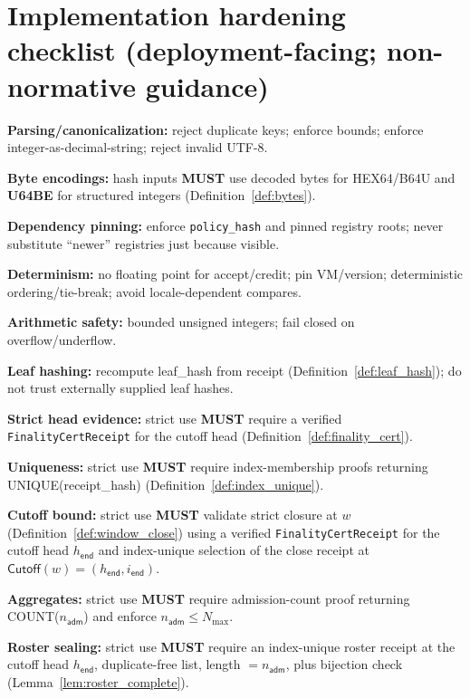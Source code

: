 \documentclass[11pt]{article}
\newcommand{\MUST}{\textbf{MUST}}
\newcommand{\code}[1]{\texttt{#1}}
\newcommand{\1}{\mathbf{1}}
\theoremstyle{definition}
\theoremstyle{plain}
\begin{document}
\section{Implementation hardening checklist (deployment-facing; non-normative guidance)}
\begin{tightitemize}
\item \textbf{Parsing/canonicalization:} reject duplicate keys; enforce bounds; enforce integer-as-decimal-string; reject invalid UTF-8.
\item \textbf{Byte encodings:} hash inputs \MUST{} use decoded bytes for HEX64/B64U and \textbf{U64BE} for structured integers (Definition~\ref{def:bytes}).
\item \textbf{Dependency pinning:} enforce \code{policy\_hash} and pinned registry roots; never substitute ``newer'' registries just because visible.
\item \textbf{Determinism:} no floating point for accept/credit; pin VM/version; deterministic ordering/tie-break; avoid locale-dependent compares.
\item \textbf{Arithmetic safety:} bounded unsigned integers; fail closed on overflow/underflow.
\item \textbf{Leaf hashing:} recompute \textsf{leaf\_hash} from receipt (Definition~\ref{def:leaf_hash}); do not trust externally supplied leaf hashes.
\item \textbf{Strict head evidence:} strict use \MUST{} require a verified \code{FinalityCertReceipt} for the cutoff head (Definition~\ref{def:finality_cert}).
\item \textbf{Uniqueness:} strict use \MUST{} require index-membership proofs returning \textsf{UNIQUE}(\textsf{receipt\_hash}) (Definition~\ref{def:index_unique}).
\item \textbf{Cutoff bound:} strict use \MUST{} validate strict closure at $w$ (Definition~\ref{def:window_close}) using a verified \code{FinalityCertReceipt} for the cutoff head $h_{\textsf{end}}$ and index-unique selection of the close receipt at $\textsf{Cutoff}(w)=(h_{\textsf{end}},i_{\textsf{end}})$.
\item \textbf{Aggregates:} strict use \MUST{} require admission-count proof returning \textsf{COUNT}($n_{\textsf{adm}}$) and enforce $n_{\textsf{adm}}\le N_{\max}$.
\item \textbf{Roster sealing:} strict use \MUST{} require an index-unique roster receipt at the cutoff head $h_{\textsf{end}}$, duplicate-free list, length $=n_{\textsf{adm}}$, plus bijection check (Lemma~\ref{lem:roster_complete}).

\end{tightitemize}
\end{document}
